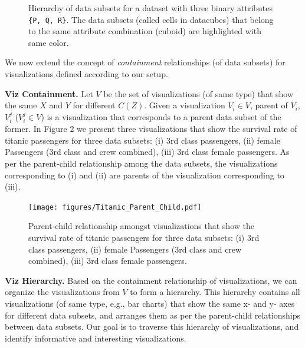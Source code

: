 \begin{figure}[ht!]
\caption{Hierarchy of data subsets for a dataset with three binary attributes {\tt \{P, Q, R\}}. The data subsets (called cells in datacubes) that belong to the same attribute combination (cuboid) are highlighted with same color.}
\label{fig:lattice}
\end{figure}
We now extend the concept of \emph{containment} relationships (of data subsets) for visualizations defined according to our setup. 

\textbf{Viz Containment.} Let $V$ be the set of visualizations (of same type) that show the same $X$ and $Y$ for different $C(Z)$. Given a visualization $V_i \in V$, parent of $V_i$, $V_i^j$ ($V_i^j\in V$) is a visualization that corresponds to a parent data subset of the former. In Figure 2 we present three visualizations that show the survival rate of titanic passengers for three data subsets: (i) 3rd class passengers, (ii) female Passengers (3rd class and crew combined), (iii) 3rd class female passengers. As per the parent-child relationship among the data subsets, the visualizations corresponding to (i) and (ii) are parents of the visualization corresponding to (iii). %

\begin{figure}[bht]
\label{example}
\centering
\texttt{[image: figures/Titanic\_Parent\_Child.pdf]}
\caption{Parent-child relationship amongst visualizations that show the survival rate of titanic passengers for three data subsets: (i) 3rd class passengers, (ii) female Passengers (3rd class and crew combined), (iii) 3rd class female passengers.}
\end{figure}

\textbf{Viz Hierarchy.} Based on the containment relationship of visualizations, we can organize the visualizations from $V$ to form a hierarchy. This hierarchy contains all visualizations (of same type, e.g., bar charts) that show the same x- and y- axes for different data subsets, and arranges them as per the parent-child relationships between data subsets. Our goal is to traverse this hierarchy of visualizations, and identify informative and interesting visualizations.

